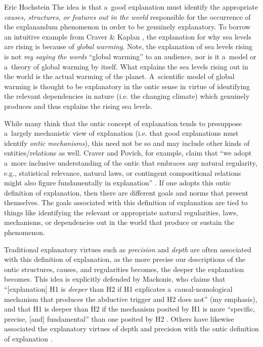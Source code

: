 \begin{artengenv}{Eric Hochstein}
The idea is that a~good explanation must identify the appropriate \textit{causes, structures, or features out in the world} responsible for the occurrence of the explanandum phenomenon in order to be genuinely explanatory. To borrow an intuitive example from Craver \& Kaplan
\parencite*[][pp.299–300]{craver_are_2020}, %
 the explanation for why sea levels are rising is because of \textit{global warming}. Note, the explanation of sea levels rising is not \textit{my saying the words} ``global warming'' to an audience, nor is it a~model or a~theory of global warming by itself. What explains the sea levels rising out in the world is the actual warming of the planet. A~scientific model of global warming is thought to be explanatory in the ontic sense in virtue of identifying the relevant dependencies in nature (i.e. the changing climate) which genuinely produces and thus explains the rising sea levels.

While many think that the ontic concept of explanation tends to presuppose a~largely mechanistic view of explanation (i.e. that good explanations must identify \textit{ontic mechanisms}), this need not be so and may include other kinds of entities/relations as well. Craver and Povich, for example, claim that ``we adopt a~more inclusive understanding of the ontic that embraces any natural regularity, e.g., statistical relevance, natural laws, or contingent compositional relations might also figure fundamentally in explanation''
\parencites[][p.32]{craver_directionality_2017}[see also:][]{povich_because_2018}. %
 If one adopts this ontic definition of explanation, then there are different goals and norms that present themselves. The goals associated with this definition of explanation are tied to things like identifying the relevant or appropriate natural regularities, laws, mechanisms, or dependencies out in the world that produce or sustain the phenomenon.

Traditional explanatory virtues such as \textit{precision} and \textit{depth} are often associated with this definition of explanation, as the more precise our descriptions of the ontic structures, causes, and regularities becomes, the deeper the explanation becomes. This idea is explicitly defended by Mackonis, who claims that ``[explanation] H1 is \textit{deeper} than H2 if H1 explicates a~causal-nomological mechanism that produces the abductive trigger and H2 does not'' (my emphasis), and that H1 is deeper than H2 if the mechanism posited by H1 is more ``specific, precise, [and] fundamental'' than one posited by H2
\parencite[][p.985]{mackonis_inference_2013}. %
 Others have likewise associated the explanatory virtues of depth and precision with the ontic definition of explanation 
\parencites[see,][]{lipton_inference_2004}{strevens_depth_2011}[][p.313]{craver_are_2020}.



\end{artengenv}
